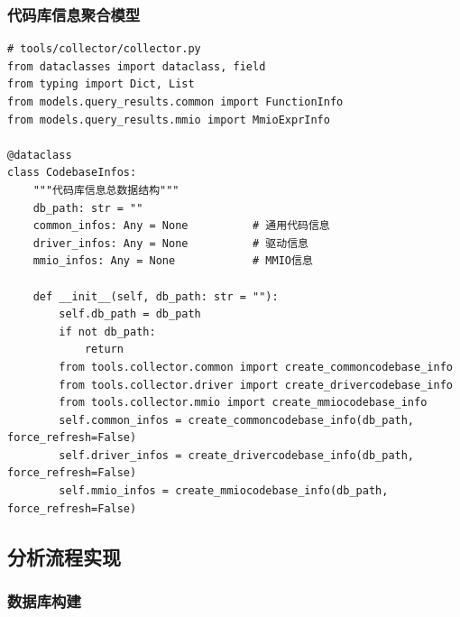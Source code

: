 \subsubsection{代码库信息聚合模型}

\begin{lstlisting}[style=Python,abovecaptionskip=0pt,belowcaptionskip=0pt]
# tools/collector/collector.py
from dataclasses import dataclass, field
from typing import Dict, List
from models.query_results.common import FunctionInfo
from models.query_results.mmio import MmioExprInfo

@dataclass
class CodebaseInfos:
    """代码库信息总数据结构"""
    db_path: str = ""
    common_infos: Any = None          # 通用代码信息
    driver_infos: Any = None          # 驱动信息
    mmio_infos: Any = None            # MMIO信息

    def __init__(self, db_path: str = ""):
        self.db_path = db_path
        if not db_path:
            return
        from tools.collector.common import create_commoncodebase_info
        from tools.collector.driver import create_drivercodebase_info
        from tools.collector.mmio import create_mmiocodebase_info
        self.common_infos = create_commoncodebase_info(db_path, force_refresh=False)
        self.driver_infos = create_drivercodebase_info(db_path, force_refresh=False)
        self.mmio_infos = create_mmiocodebase_info(db_path, force_refresh=False)
\end{lstlisting}

\subsection{分析流程实现}

\subsubsection{数据库构建}

